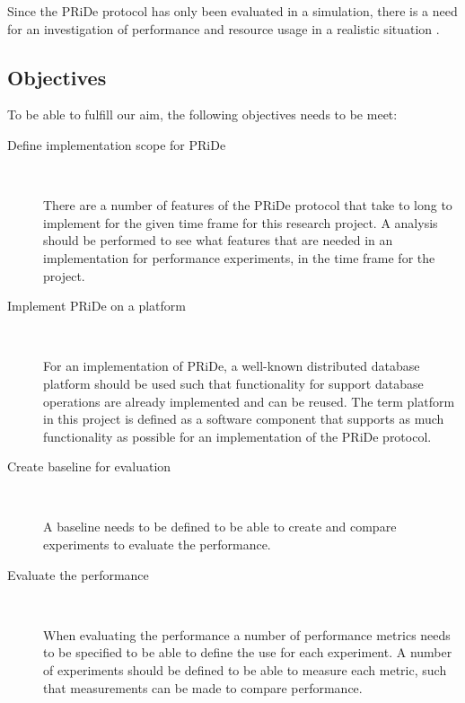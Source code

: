 Since the PRiDe protocol has only been evaluated in a simulation, there is a need for an investigation of performance and resource usage in a realistic situation \cite[]{Syber2007}.

\subsection{Objectives} 
\label{subsec:objectives}

To be able to fulfill our aim, the following objectives needs to be meet:  

\begin{description}

	\item[Define implementation scope for PRiDe] \

	There are a number of features of the PRiDe protocol that take to long to implement for the given time frame for this research project. A analysis should be performed to see what features that are needed in an implementation for performance experiments, in the time frame for the project.

	\item[Implement PRiDe on a platform] \

	For an implementation of PRiDe, a well-known distributed database platform should be used such that functionality for support database operations are already implemented and can be reused. The term platform in this project is defined as a software component that supports as much functionality as possible for an implementation of the PRiDe protocol. 

	\item[Create baseline for evaluation] \

	A baseline needs to be defined to be able to create and compare experiments to evaluate the performance.  


	\item[Evaluate the performance] \

	When evaluating the performance a number of performance metrics needs to be specified to be able to define the use for each experiment. A number of experiments should be defined to be able to measure each metric, such that measurements can be made to compare performance.  
	

\end{description}
